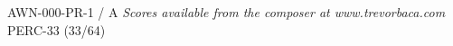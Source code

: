 \documentclass[11pt]{report}
\begin{document}
\null \vfill

AWN-000-PR-1 / A \hfill
\textit{Scores available from the composer at www.trevorbaca.com}
\hfill PERC-33 (33/64)
\end{document}
